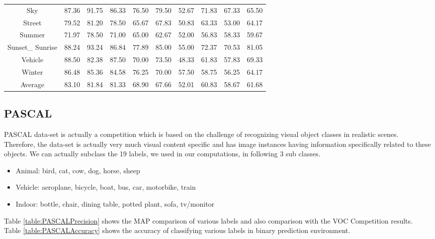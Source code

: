 \begin{sidewaystable}
\begin{tabular}{|c| p{2cm}| p{2cm}| p{2cm}| p{2cm}| p{2cm}|c|c|c|c|}
Sky & 87.36 & 91.75 & 86.33 & 76.50 & 79.50 & 52.67 & 71.83 & 67.33 & 65.50 \\  [1ex]
Street & 79.52 & 81.20 & 78.50 & 65.67 & 67.83 & 50.83 & 63.33 & 53.00 & 64.17 \\  [1ex]
Summer & 71.97 & 78.50 & 71.00 & 65.00 & 62.67 & 52.00 & 56.83 & 58.33 & 59.67 \\  [1ex]
Sunset\_ Sunrise & 88.24 & 93.24 & 86.84 & 77.89 & 85.00 & 55.00 & 72.37 & 70.53 & 81.05 \\  [1ex]
Vehicle & 88.50 & 82.38 & 87.50 & 70.00 & 73.50 & 48.33 & 61.83 & 57.83 & 69.33 \\  [1ex]
Winter & 86.48 & 85.36 & 84.58 & 76.25 & 70.00 & 57.50 & 58.75 & 56.25 & 64.17 \\  [1ex] \hline
Average & 83.10 & 81.84 & 81.33 & 68.90 & 67.66 & 52.01 & 60.83 & 58.67 & 61.68 \\  [1ex] \hline

\end{tabular}
\label{table:ImageCLEFAccuracy} %
\end{sidewaystable}

\subsection{PASCAL}

PASCAL data-set is actually a competition which is based on the challenge of recognizing visual object classes in realistic scenes. Therefore, the data-set is actually very much visual content specific and has image instances having information specifically related to these objects. We can actually subclass the 19 labels, we used in our computations, in following 3 sub classes.

\begin{itemize}
\item Animal: bird, cat, cow, dog, horse, sheep
\item Vehicle: aeroplane, bicycle, boat, bus, car, motorbike, train
\item Indoor: bottle, chair, dining table, potted plant, sofa, tv/monitor

\end{itemize}

Table \ref{table:PASCALPrecision} shows the MAP comparison of various labels and also comparison with the VOC Competition results.
Table \ref{table:PASCALAccuracy} shows the accuracy of classifying various labels in binary prediction environment.


